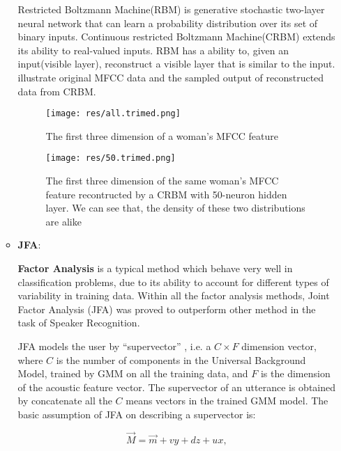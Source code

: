 \begin{enumerate}
\begin{itemize}
			Restricted Boltzmann Machine(RBM) is generative stochastic
			two-layer neural network that can learn a probability distribution
			over its set of binary inputs\cite{rbm_wiki}.  Continuous
			restricted Boltzmann Machine(CRBM)\cite{chen2003continuous} extends
			its ability to real-valued inputs.  RBM has a ability to, given an
			input(visible layer), reconstruct a visible layer that is similar
			to the input.   illustrate original MFCC data and the
			sampled output of
			reconstructed data from CRBM.
			\begin{figure}[!ht]
				\label{fig:crbm}
				\begin{minipage}{0.48\linewidth}
					\centering
					\texttt{[image: res/all.trimed.png]}
					\caption{The first three dimension of a woman's MFCC feature}
				\end{minipage}
				\hfill
				\begin{minipage}{0.48\linewidth}
					\centering
					\texttt{[image: res/50.trimed.png]}
					\caption{The first three dimension of the same woman's MFCC feature
					recontructed by a CRBM with 50-neuron hidden layer. We can
					see that, the density of these two distributions are alike}
				\end{minipage}
			\end{figure}


		\item \textbf{JFA}:

          \textbf{Factor Analysis} is a typical method which behave
          very well in classification problems, due to its ability to
          account for different types of variability in training data.
          Within all the factor analysis methods,
          Joint Factor Analysis (JFA)\cite{jfa2,jfa-se} was proved to outperform other method
          in the task of Speaker Recognition.

          JFA models the user by ``supervector'' , i.e. a $C\times F $ dimension vector, where $C$ is
          the number of components in the Universal Background Model, trained by GMM on all the training data,
          and $ F$ is the dimension of the acoustic feature vector. The supervector of an utterance is obtained by concatenate
          all the $C $ means vectors in the trained GMM model. The basic assumption of JFA on describing a supervector is:

          \[ \vec{M} = \vec{ m } + vy + dz + ux, \]


\end{itemize}
\end{enumerate}
